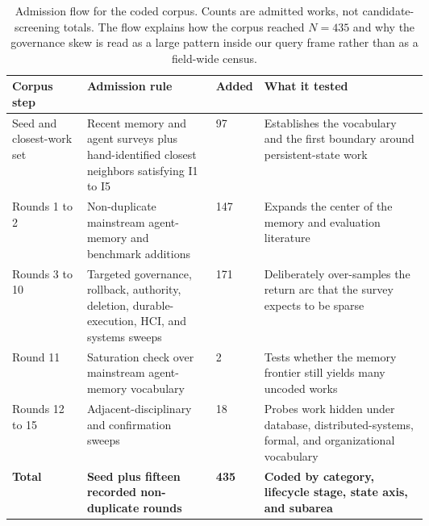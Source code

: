 \begin{table}[t]
\centering
\small
\setlength{\tabcolsep}{4pt}\renewcommand{\arraystretch}{1.16}
\begin{tabularx}{\linewidth}{p{0.18\linewidth}p{0.31\linewidth}p{0.11\linewidth}Y}
\toprule
Corpus step & Admission rule & Added & What it tested \\
\midrule
Seed and closest-work set & Recent memory and agent surveys plus hand-identified closest neighbors satisfying I1 to I5 & 97 & Establishes the vocabulary and the first boundary around persistent-state work \\
Rounds 1 to 2 & Non-duplicate mainstream agent-memory and benchmark additions & 147 & Expands the center of the memory and evaluation literature \\
Rounds 3 to 10 & Targeted governance, rollback, authority, deletion, durable-execution, HCI, and systems sweeps & 171 & Deliberately over-samples the return arc that the survey expects to be sparse \\
Round 11 & Saturation check over mainstream agent-memory vocabulary & 2 & Tests whether the memory frontier still yields many uncoded works \\
Rounds 12 to 15 & Adjacent-disciplinary and confirmation sweeps & 18 & Probes work hidden under database, distributed-systems, formal, and organizational vocabulary \\
\midrule
\textbf{Total} & \textbf{Seed plus fifteen recorded non-duplicate rounds} & \textbf{435} & \textbf{Coded by category, lifecycle stage, state axis, and subarea} \\
\bottomrule
\end{tabularx}
\caption{Admission flow for the coded corpus. Counts are admitted works, not candidate-screening totals. The flow explains how the corpus reached $N{=}435$ and why the governance skew is read as a large pattern inside our query frame rather than as a field-wide census.}
\label{tab:corpus-flow}
\end{table}

